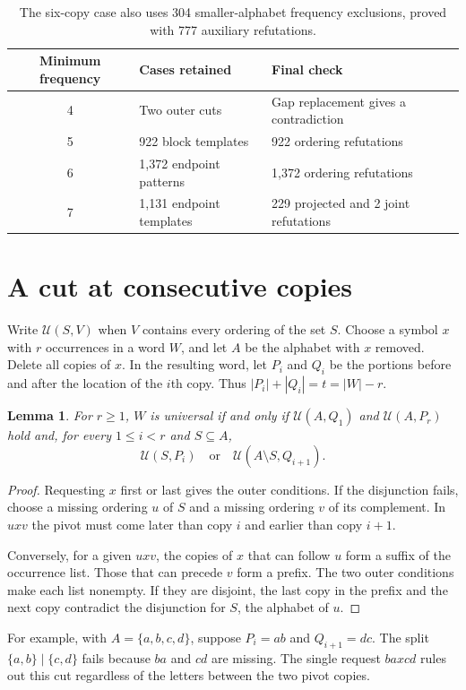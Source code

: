 \documentclass[11pt]{article}
\newtheorem{lemma}[theorem]{Lemma}
\newcommand{\cov}{\mathcal U}
\begin{document}
\begin{table}[ht]
\centering\small
\begin{tabular}{cll}
\toprule
Minimum frequency & Cases retained & Final check\\
\midrule
4 & Two outer cuts & Gap replacement gives a contradiction\\
5 & 922 block templates & 922 ordering refutations\\
6 & 1,372 endpoint patterns & 1,372 ordering refutations\\
7 & 1,131 endpoint templates & 229 projected and 2 joint refutations\\
\bottomrule
\end{tabular}
\caption{The six-copy case also uses 304 smaller-alphabet frequency exclusions, proved with 777 auxiliary refutations.}\label{tab:cases}
\end{table}

\section{A cut at consecutive copies}
Write $\cov(S,V)$ when $V$ contains every ordering of the set $S$. Choose a symbol $x$ with $r$ occurrences in a word $W$, and let $A$ be the alphabet with $x$ removed. Delete all copies of $x$. In the resulting word, let $P_i$ and $Q_i$ be the portions before and after the location of the $i$th copy. Thus $|P_i|+|Q_i|=t=|W|-r$.

\begin{lemma}\label{lem:cut}
For $r\ge1$, $W$ is universal if and only if $\cov(A,Q_1)$ and $\cov(A,P_r)$ hold and, for every $1\le i<r$ and $S\subseteq A$,
\[
                 \cov(S,P_i)\quad\text{or}\quad \cov(A\setminus S,Q_{i+1}).
\]
\end{lemma}
\begin{proof}
Requesting $x$ first or last gives the outer conditions. If the disjunction fails, choose a missing ordering $u$ of $S$ and a missing ordering $v$ of its complement. In $uxv$ the pivot must come later than copy $i$ and earlier than copy $i+1$.

Conversely, for a given $uxv$, the copies of $x$ that can follow $u$ form a suffix of the occurrence list. Those that can precede $v$ form a prefix. The two outer conditions make each list nonempty. If they are disjoint, the last copy in the prefix and the next copy contradict the disjunction for $S$, the alphabet of $u$.
\end{proof}
For example, with $A=\{a,b,c,d\}$, suppose $P_i=ab$ and $Q_{i+1}=dc$. The split $\{a,b\}\mid\{c,d\}$ fails because $ba$ and $cd$ are missing. The single request $baxcd$ rules out this cut regardless of the letters between the two pivot copies.
\end{document}
